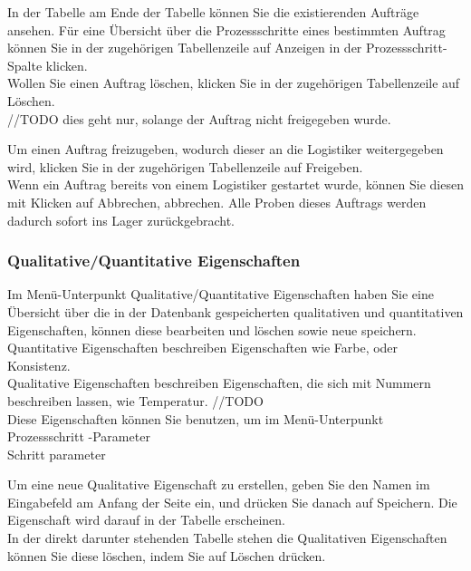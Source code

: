 \documentclass[enabledeprecatedfontcommands,fontsize=12pt,paper=a4,twoside]{scrartcl}
\begin{document}
In der Tabelle am Ende der Tabelle können Sie die existierenden Aufträge ansehen. Für eine Übersicht über die Prozessschritte eines bestimmten Auftrag können Sie in der zugehörigen Tabellenzeile auf Anzeigen in der Prozessschritt-Spalte klicken. \\

Wollen Sie einen Auftrag löschen, klicken Sie in der zugehörigen Tabellenzeile auf Löschen. \\ 
//TODO dies geht nur, solange der Auftrag nicht freigegeben wurde. 

Um einen Auftrag freizugeben, wodurch dieser an die Logistiker weitergegeben wird, klicken Sie in der zugehörigen Tabellenzeile auf Freigeben. \\

Wenn ein Auftrag bereits von einem Logistiker gestartet wurde, können Sie diesen mit Klicken auf Abbrechen, abbrechen. Alle Proben dieses Auftrags werden dadurch sofort ins Lager zurückgebracht. \\

\subsubsection{Qualitative/Quantitative Eigenschaften}

Im Menü-Unterpunkt Qualitative/Quantitative Eigenschaften haben Sie eine Übersicht über die in der Datenbank gespeicherten qualitativen und quantitativen Eigenschaften, können diese bearbeiten und löschen sowie neue speichern. \\

Quantitative Eigenschaften beschreiben Eigenschaften wie Farbe, oder Konsistenz. \\

Qualitative Eigenschaften beschreiben Eigenschaften, die sich mit Nummern beschreiben lassen, wie Temperatur. //TODO\\

Diese Eigenschaften können Sie benutzen, um im Menü-Unterpunkt Prozessschritt -Parameter\\
Schritt parameter

Um eine neue Qualitative Eigenschaft zu erstellen, geben Sie den Namen im Eingabefeld am Anfang der Seite ein, und drücken Sie danach auf Speichern. Die Eigenschaft wird darauf in der Tabelle erscheinen. \\

In der direkt darunter stehenden Tabelle stehen die Qualitativen Eigenschaften können Sie diese löschen, indem Sie auf Löschen drücken. \\
\end{document}

